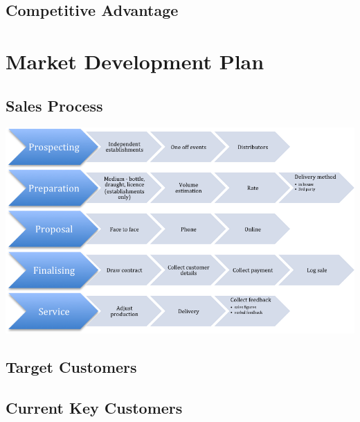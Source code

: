 \documentclass[11pt]{article}
\begin{document}
  \subsection{Competitive Advantage}

\newpage
\section{Market Development Plan}
  \subsection{Sales Process}
  \includegraphics[width=\textwidth,keepaspectratio]{./process.png}

  \subsection{Target Customers}

  \subsection{Current Key Customers}
\end{document}

